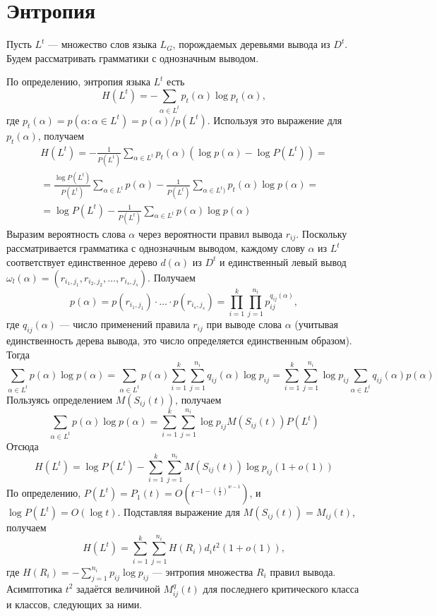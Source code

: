 \documentclass[12pt]{article}
\begin{document}
\section{Энтропия}
Пусть $L^t$ --- множество слов языка $L_G$, порождаемых деревьями вывода из $D^t$. Будем рассматривать грамматики с однозначным выводом.

По определению, энтропия языка $L^t$ есть
\begin{equation*}
	H(L^t) = - \sum_{\alpha \in L^t} p_t(\alpha) \log p_t(\alpha),
\end{equation*}
где $p_t(\alpha) = p(\alpha : \alpha \in L^t) = p(\alpha) / p(L^t)$. Используя это выражение для $p_t(\alpha)$, получаем
\begin{multline*}
	H(L^t) = - \frac{1}{P(L^t)} \sum_{\alpha \in L^t} p_t(\alpha) \left( \log p(\alpha) - \log P(L^t) \right) = \\
	= \frac{\log P(L^t)}{P(L^t)} \sum_{\alpha \in L^t} p(\alpha) - \frac{1}{P(L^t)} \sum_{\alpha \in L^t)} p_t(\alpha) \log p(\alpha) = \\
	= \log P(L^t) - \frac{1}{P(L^t)} \sum_{\alpha \in L^t} p(\alpha) \log p(\alpha)
\end{multline*}
Выразим вероятность слова $\alpha$ через вероятности правил вывода $r_{ij}$. Поскольку рассматривается грамматика с однозначным выводом, каждому слову $\alpha$ из $L^t$ соответствует единственное дерево $d(\alpha)$ из $D^t$ и единственный левый вывод $\omega_l(\alpha) = (r_{i_1,j_1}, r_{i_2,j_2}, \ldots, r_{i_s,j_s})$. Получаем
\begin{equation*}
	p(\alpha) = p(r_{i_1,j_1}) \cdot \ldots \cdot p(r_{i_s,j_s}) = \prod_{i=1}^k \prod_{j=1}^{n_i} p_{ij}^{q_{ij}(\alpha)},
\end{equation*}
где $q_{ij}(\alpha)$ --- число применений правила $r_{ij}$ при выводе слова $\alpha$ (учитывая единственность дерева вывода, это число определяется единственным образом). Тогда
\begin{equation*}
	\sum_{\alpha \in L^t} p(\alpha) \log p(\alpha) = \sum_{\alpha \in L^t} p(\alpha) \sum_{i=1}^k \sum_{j=1}^{n_i} q_{ij}(\alpha) \log p_{ij} = \sum_{i=1}^k \sum_{j=1}^{n_i} \log p_{ij} \sum_{\alpha \in L^t} q_{ij}(\alpha) p(\alpha)
\end{equation*}
Пользуясь определением $M(S_{ij}(t))$, получаем
\begin{equation*}
	\sum_{\alpha \in L^t} p(\alpha) \log p(\alpha) = \sum_{i=1}^k \sum_{j=1}^{n_i} \log p_{ij} M(S_{ij}(t)) P(L^t)
\end{equation*}
Отсюда
\begin{equation*}
	H(L^t) = \log P(L^t) - \sum_{i=1}^k \sum_{j=1}^{n_i} M(S_{ij}(t)) \log p_{ij} (1 + o(1))
\end{equation*}
По определению, $P(L^t) = P_1(t) = O(t^{-1 -\left(\frac{1}{2}\right)^{w-1}})$, и $\log P(L^t) = O(\log t)$. Подставляя выражение для $M(S_{ij}(t)) = M_{ij}(t)$, получаем
\begin{equation*}
	H(L^t) = \sum_{i=1}^k \sum_{j=1}^{n_i} H(R_i) d_i t^2 (1 + o(1)),
\end{equation*}
где $H(R_i) = - \sum_{j=1}^{n_i} p_{ij} \log p_{ij}$ --- энтропия множества $R_i$ правил вывода. Асимптотика $t^2$ задаётся величиной $M^q_{ij}(t)$ для последнего критического класса и классов, следующих за ними.
\end{document}

